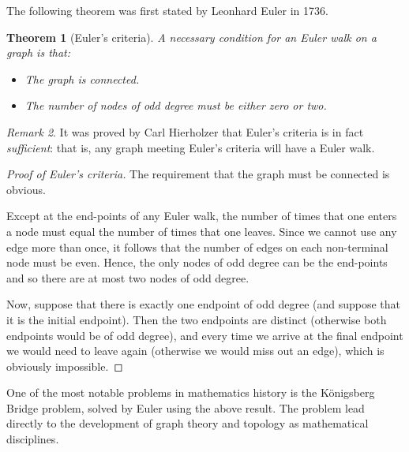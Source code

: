 \documentclass[a4paper, 10pt]{amsart}
\newtheorem{thm}{Theorem}[section]
\theoremstyle{definition}
\theoremstyle{remark}
\newtheorem{rem}[thm]{Remark}
\begin{document}
The following theorem was first stated by Leonhard Euler in 1736.

\begin{thm}[Euler's criteria]
  A \textit{necessary} condition for an Euler walk on a graph is that:
  \begin{itemize}
    \item The graph is connected.
    \item The number of nodes of odd degree must be either zero or two.
  \end{itemize}
\end{thm}

\begin{rem}
  It was proved by Carl Hierholzer that Euler's criteria is in fact \textit{sufficient}: that is,
  any graph meeting Euler's criteria will have a Euler walk.
\end{rem}

\begin{proof}[Proof of Euler's criteria]
  The requirement that the graph must be connected is obvious.

  Except at the end-points of any Euler walk, the number of times that one enters a node must equal the number of times that
  one leaves. Since we cannot use any edge more than once, it follows that the number of edges on each non-terminal
  node must be even. Hence, the only nodes of odd degree can be the end-points and so there are at most two nodes of odd degree.

  Now, suppose that there is exactly one endpoint of odd degree (and suppose that it is the initial endpoint). Then the two endpoints
  are distinct (otherwise both endpoints would be of odd degree), and every time we arrive at the final endpoint we would need to leave
  again (otherwise we would miss out an edge), which is obviously impossible.
\end{proof}

One of the most notable problems in mathematics history is the K\"onigsberg Bridge problem, solved by Euler using the above
result. The problem lead directly to the development of graph theory and topology as mathematical disciplines.
\end{document}
